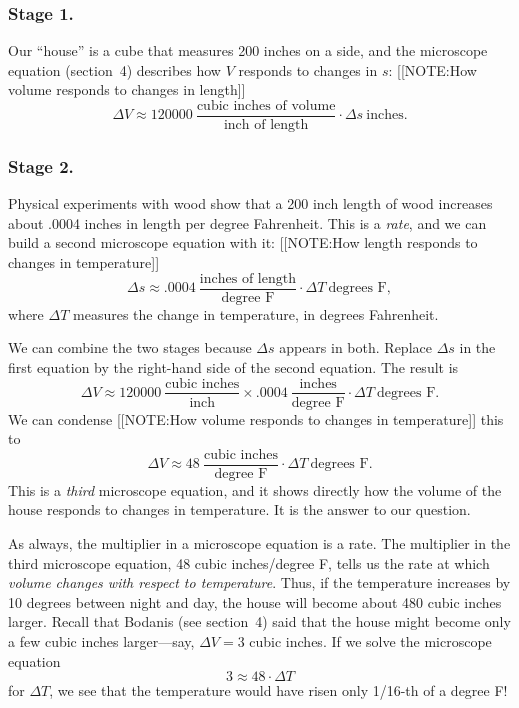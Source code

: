\subsubsection{Stage 1.}
Our ``house'' is a cube that measures 200
inches on a side, and the microscope equation
(section~4) describes how $V$ responds to changes in $s$:
[[NOTE:How volume responds to changes in length]]
\[
\Delta V \approx 120000 \ 
   \dfrac{\mbox{cubic inches of volume}}{\mbox{inch of length}}
		\cdot \Delta s \ \mbox{inches}.
\]
\subsubsection{Stage 2.}
Physical experiments with wood show that a 200 inch
length of wood increases about .0004 inches in length per degree
Fahrenheit.  This is a {\em rate}, and we can build a second
microscope equation with it: [[NOTE:How length responds to
changes in temperature]]
\[
\Delta s \approx 
	.0004\ \dfrac{\mbox{inches of length}}{\mbox{degree F}}
		\cdot \Delta T \ \mbox{degrees F},
\]
where $\Delta T$ measures the change in temperature, in degrees
Fahrenheit.


We can combine the two stages because $\Delta s$ appears in both.
Replace $\Delta s$ in the first equation by the right-hand side of the
second equation.  The result is
\[
\Delta V \approx 120000 \ 
    \dfrac{\mbox{cubic inches}}{\mbox{inch}} \times 
		.0004\ \dfrac{\mbox{inches}}{\mbox{degree F}}
          \cdot \Delta T \ \mbox{degrees F}.
\]
We can condense 
[[NOTE:How volume responds to changes in temperature]]
this to     
\[
\Delta V \approx 48 \ 
		\dfrac{\mbox{cubic inches}}{\mbox{degree F}}
          \cdot \Delta T \ \mbox{degrees F}.
\]
This is a {\em third\/} microscope equation, and it shows directly how
the volume of the house responds to changes in temperature.  It is the
answer to our question.

As always, the multiplier\index{multiplier} in a microscope equation
is a rate.  The multiplier in the third microscope equation, 48 cubic
inches/degree F, tells us the rate at which {\em volume changes with
  respect to temperature}.  Thus, if the temperature increases by 10
degrees between night and day, the house will become about 480 cubic
inches larger.  Recall that Bodanis (see section~4) said that the house
might become only a few cubic inches larger---say, $\Delta V = 3$
cubic inches.  If we solve the microscope equation
	\[
3 \approx 48 \cdot \Delta T
\]
for $\Delta T$, we see that the temperature would have risen only
1/16-th of a degree F!

